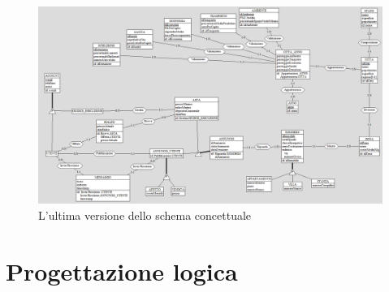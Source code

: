 \documentclass[a4paper,12pt]{report}
\begin{document}
        \begin{figure}[ht]
            \centering{}
            \includegraphics[width=\linewidth]{./images/fourth.png}
            \caption{L'ultima versione dello schema concettuale}
        \end{figure}

        	
	\chapter{Progettazione logica} 
\end{document}
